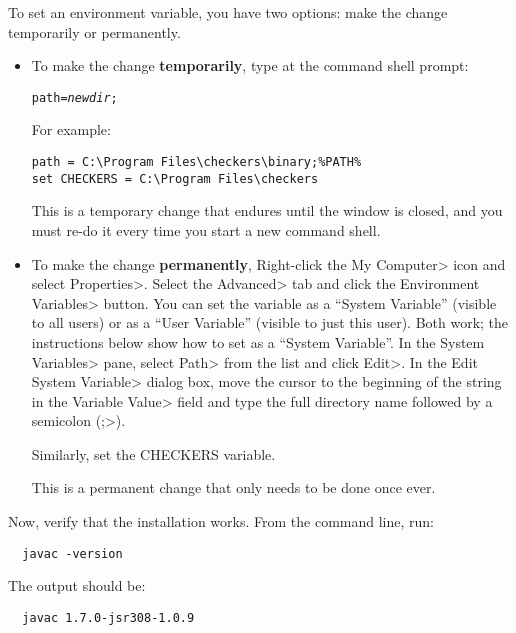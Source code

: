 \begin{enumerate}
To set an environment variable, you have two options:  make the change
temporarily or permanently.
\begin{itemize}
\item
To make the change \textbf{temporarily}, type at the command shell prompt:

\begin{alltt}
path = \emph{newdir};%PATH%
\end{alltt}

For example:

\begin{Verbatim}
path = C:\Program Files\checkers\binary;%PATH%
set CHECKERS = C:\Program Files\checkers
\end{Verbatim}

This is a temporary change that endures until the window is closed, and you
must re-do it every time you start a new command shell.

\item
To make the change \textbf{permanently},
Right-click the \<My Computer> icon and
select \<Properties>. Select the \<Advanced> tab and click the
\<Environment Variables> button. You can set the variable as a ``System
Variable'' (visible to all users) or as a ``User Variable'' (visible to
just this user).  Both work; the instructions below show how to set as a
``System Variable''.
In the \<System Variables> pane, select
\<Path> from the list and click \<Edit>. In the \<Edit System Variable>
dialog box, move the cursor to the beginning of the string in the
\<Variable Value> field and type the full directory name followed by a
semicolon (\<;>).

Similarly, set the CHECKERS variable.

This is a permanent change that only needs to be done once ever.
\end{itemize}



Now, verify that the installation works.  From the command line, run:

\begin{Verbatim}
  javac -version
\end{Verbatim}

The output should be:

\begin{Verbatim}
  javac 1.7.0-jsr308-1.0.9
\end{Verbatim}

\end{enumerate}


